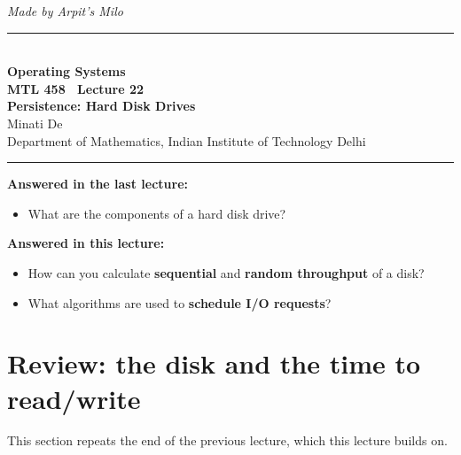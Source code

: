 \documentclass[11pt,a4paper]{article}
\begin{document}
\begin{center}
{\small\itshape Made by Arpit's Milo}\\[0.3em]
{\color{rulegray}\rule{\textwidth}{1.1pt}}\\[0.45em]
{\LARGE\bfseries Operating Systems}\\[0.25em]
{\Large\bfseries MTL 458 \textperiodcentered\ Lecture 22}\\[0.35em]
{\LARGE\bfseries Persistence: Hard Disk Drives}\\[0.35em]
{\large Minati De}\\[0.15em]
{\normalsize Department of Mathematics, Indian Institute of Technology Delhi}\\[0.35em]
{\color{rulegray}\rule{\textwidth}{1.1pt}}
\end{center}

\vspace{0.4em}
\begin{keybox}[Questions]
\textbf{Answered in the last lecture:}
\begin{itemize}
  \item What are the components of a hard disk drive?
\end{itemize}
\textbf{Answered in this lecture:}
\begin{itemize}
  \item How can you calculate \textbf{sequential} and \textbf{random
        throughput} of a disk?
  \item What algorithms are used to \textbf{schedule I/O requests}?
\end{itemize}
\end{keybox}

\begingroup\small{}\tableofcontents\endgroup
\vspace{0.6em}
\noindent{\color{rulegray}\rule{\textwidth}{0.4pt}}

\section{Review: the disk and the time to read/write}

This section repeats the end of the previous lecture, which this lecture
builds on.
\end{document}
